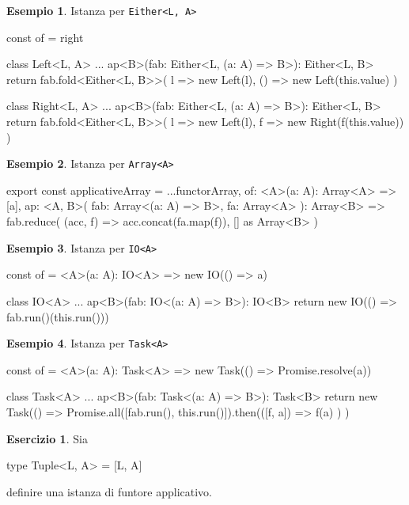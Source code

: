 \documentclass[12pt]{article}
\theoremstyle{definition}
\newtheorem{example}{Esempio}[section]
\newtheorem{exercise}{Esercizio}[section]
\newenvironment{code}
  {\vspace{0.5cm} \VerbatimEnvironment\begin{typescriptcode}}
  {\end{typescriptcode} \vspace{0.2cm}}
\begin{document}
\begin{example}
Istanza per \texttt{Either<L, A>}

\begin{code}
const of = right

class Left<L, A> {
  ...
  ap<B>(fab: Either<L, (a: A) => B>): Either<L, B> {
    return fab.fold<Either<L, B>>(
      l => new Left(l),
      () => new Left(this.value)
    )
  }
}

class Right<L, A> {
  ...
  ap<B>(fab: Either<L, (a: A) => B>): Either<L, B> {
    return fab.fold<Either<L, B>>(
      l => new Left(l),
      f => new Right(f(this.value))
    )
  }
}
\end{code}
\end{example}

\begin{example}
Istanza per \texttt{Array<A>}

\begin{code}
export const applicativeArray = {
  ...functorArray,
  of: <A>(a: A): Array<A> => [a],
  ap: <A, B>(
    fab: Array<(a: A) => B>,
    fa: Array<A>
  ): Array<B> =>
    fab.reduce(
      (acc, f) => acc.concat(fa.map(f)),
      [] as Array<B>
    )
}
\end{code}
\end{example}

\begin{example}
Istanza per \texttt{IO<A>}

\begin{code}
const of = <A>(a: A): IO<A> => new IO(() => a)

class IO<A> {
  ...
  ap<B>(fab: IO<(a: A) => B>): IO<B> {
    return new IO(() => fab.run()(this.run()))
  }
}
\end{code}
\end{example}

\begin{example}
Istanza per \texttt{Task<A>}

\begin{code}
const of = <A>(a: A): Task<A> =>
  new Task(() => Promise.resolve(a))

class Task<A> {
  ...
  ap<B>(fab: Task<(a: A) => B>): Task<B> {
    return new Task(() =>
      Promise.all([fab.run(), this.run()]).then(([f, a]) =>
        f(a)
      )
    )
  }
}
\end{code}
\end{example}

\begin{exercise}
Sia

\begin{code}
type Tuple<L, A> = [L, A]
\end{code}

definire una istanza di funtore applicativo.
\end{exercise}
\end{document}
